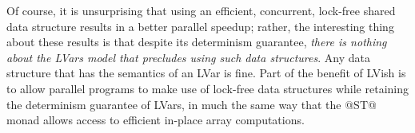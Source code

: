 Of course, it is unsurprising that using an efficient, concurrent,
lock-free shared data structure results in a better parallel speedup;
rather, the interesting thing about these results is that despite its
determinism guarantee, \emph{there is nothing about the LVars model
  that precludes using such data structures}.  Any data structure that
has the semantics of an LVar is fine.  Part of the benefit of LVish is
to allow parallel programs to make use of lock-free data structures
while retaining the determinism guarantee of LVars, in much the same
way that the @ST@ monad allows access to efficient in-place array
computations.
